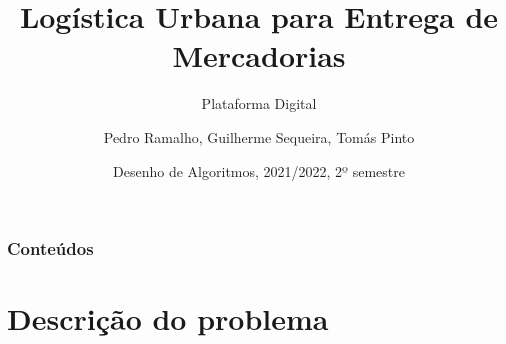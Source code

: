 \documentclass{beamer}
\title[Plataforma Digital]
{Logística Urbana para Entrega de Mercadorias}
\subtitle{Plataforma Digital}
\author[Grupo 30, 2LEIC03]
{Pedro Ramalho, Guilherme Sequeira, Tomás Pinto}
\institute[FEUP]
{
  Faculdade de Engenheria\\
  Universidade do Porto
}
\date[2021/2022 2S]
{Desenho de Algoritmos, 2021/2022, 2º semestre}
\begin{document}

\frame{\titlepage}



\begin{frame}
\frametitle{Conteúdos}
\tableofcontents
\end{frame}


\section{Descrição do problema}
\end{document}
